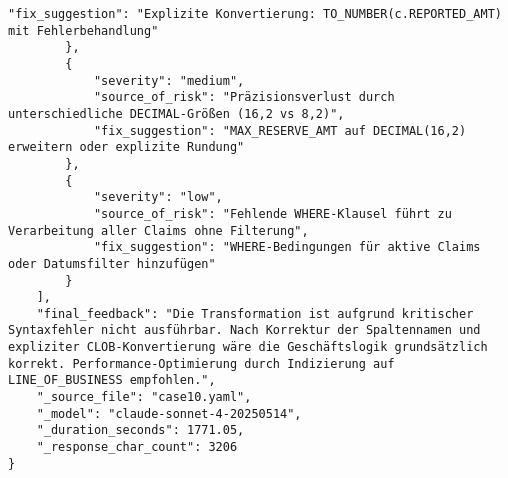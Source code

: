 \begin{lstlisting}[caption={Ausgabe: Claude Sonnet 4 Anwendungsfall 10 Konsistenzdurchlauf},label={claude_case10_prompt2}]
            "fix_suggestion": "Explizite Konvertierung: TO_NUMBER(c.REPORTED_AMT) mit Fehlerbehandlung"
        },
        {
            "severity": "medium",
            "source_of_risk": "Präzisionsverlust durch unterschiedliche DECIMAL-Größen (16,2 vs 8,2)",
            "fix_suggestion": "MAX_RESERVE_AMT auf DECIMAL(16,2) erweitern oder explizite Rundung"
        },
        {
            "severity": "low",
            "source_of_risk": "Fehlende WHERE-Klausel führt zu Verarbeitung aller Claims ohne Filterung",
            "fix_suggestion": "WHERE-Bedingungen für aktive Claims oder Datumsfilter hinzufügen"
        }
    ],
    "final_feedback": "Die Transformation ist aufgrund kritischer Syntaxfehler nicht ausführbar. Nach Korrektur der Spaltennamen und expliziter CLOB-Konvertierung wäre die Geschäftslogik grundsätzlich korrekt. Performance-Optimierung durch Indizierung auf LINE_OF_BUSINESS empfohlen.",
    "_source_file": "case10.yaml",
    "_model": "claude-sonnet-4-20250514",
    "_duration_seconds": 1771.05,
    "_response_char_count": 3206
}
\end{lstlisting}

